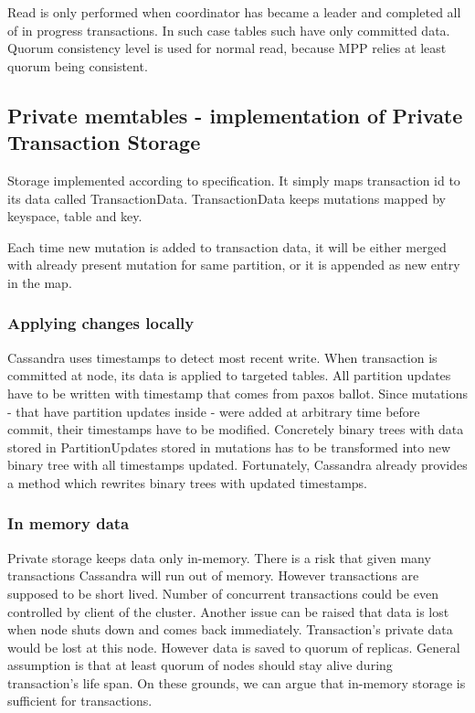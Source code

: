 Read is only performed when coordinator has became a leader and completed all of in progress transactions. In such case tables such have only committed data. Quorum consistency level is used for normal read, because MPP relies at least quorum being consistent.




\subsection{Private memtables - implementation of Private Transaction Storage}
Storage implemented according to specification. It simply maps transaction id to its data called TransactionData. TransactionData keeps mutations mapped by keyspace, table and key.


Each time new mutation is added to transaction data, it will be either merged with already present mutation for same partition, or it is appended as new entry in the map.


\subsubsection{Applying changes locally}
Cassandra uses timestamps to detect most recent write. When transaction is committed at node, its data is applied to targeted tables. All partition updates have to be written with timestamp that comes from paxos ballot. Since mutations - that have partition updates inside - were added at arbitrary time before commit, their timestamps have to be modified. Concretely binary trees with data stored in PartitionUpdates stored in mutations has to be transformed into new binary tree with all timestamps updated. Fortunately, Cassandra already provides a method which rewrites binary trees with updated timestamps.


\subsubsection{In memory data}
Private storage keeps data only in-memory. There is a risk that given many transactions Cassandra will run out of memory. However transactions are supposed to be short lived. Number of concurrent transactions could be even controlled by client of the cluster. 
Another issue can be raised that data is lost when node shuts down and comes back immediately. Transaction’s private data would be lost at this node. However data is saved to quorum of replicas. General assumption is that at least quorum of nodes should stay alive during transaction’s life span. On these grounds, we can argue that in-memory storage is sufficient for transactions.



